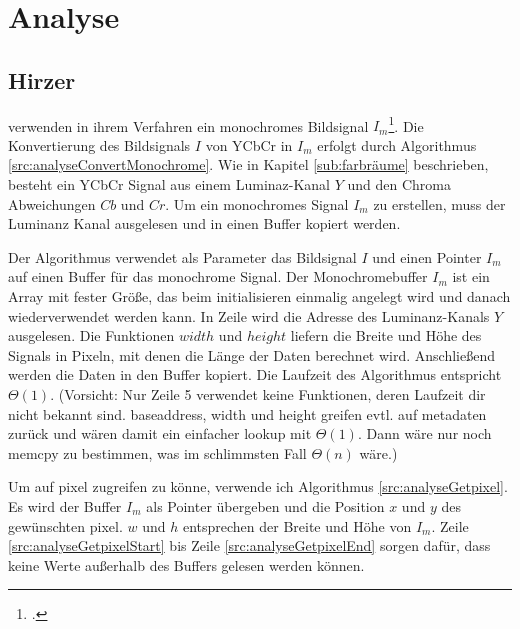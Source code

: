 \section{Analyse} %
\label{sec:analyse}
\begin{comment}
	Detailierte Beschreibung der Algorithmen inkl. O-Notation (Nitty-Gritty Darstellung der Algos)
	1. ARToolKit
	2. ARToolKitPlus
	3. Zissermann/Clarke
	Analyse: Die auswertung nach den Kriterein aus Kap. Vorgehen OHNE WERTUNG! Nur die Daten erheben und auswerten.
\end{comment}

\subsection{Hirzer} %
\label{sub:hirzer}

\citeauthor{clarke96} verwenden in ihrem Verfahren ein monochromes Bildsignal $I_m$\footcite[Vgl.][S.~417]{clarke96}. Die Konvertierung des Bildsignals $I$ von YCbCr in $I_m$ erfolgt durch Algorithmus \ref{src:analyseConvertMonochrome}. Wie in Kapitel \ref{sub:farbräume} beschrieben, besteht ein YCbCr Signal aus einem Luminaz-Kanal $Y$ und den Chroma Abweichungen $Cb$ und $Cr$. Um ein monochromes Signal $I_m$ zu erstellen, muss der Luminanz Kanal ausgelesen und in einen Buffer kopiert werden.



Der Algorithmus verwendet als Parameter das Bildsignal $I$ und einen Pointer $I_m$ auf einen Buffer für das monochrome Signal. Der Monochromebuffer $I_m$ ist ein Array mit fester Größe, das beim initialisieren einmalig angelegt wird und danach wiederverwendet werden kann. In Zeile  wird die Adresse des Luminanz-Kanals $Y$ ausgelesen. Die Funktionen $width$ und $height$ liefern die Breite und Höhe des Signals in Pixeln, mit denen die Länge der Daten berechnet wird. Anschließend werden die Daten in den Buffer kopiert. Die Laufzeit des Algorithmus entspricht $\Theta(1)$. (Vorsicht: Nur Zeile 5 verwendet keine Funktionen, deren Laufzeit dir nicht bekannt sind. baseaddress, width und height greifen evtl. auf metadaten zurück und wären damit ein einfacher lookup mit $\Theta(1)$. Dann wäre nur noch memcpy zu bestimmen, was im schlimmsten Fall $\Theta(n)$ wäre.)

Um auf \gls{pixel} zugreifen zu könne, verwende ich Algorithmus \ref{src:analyseGetpixel}. Es wird der Buffer $I_m$ als Pointer übergeben und die Position $x$ und $y$ des gewünschten \gls{pixel}. $w$ und $h$ entsprechen der Breite und Höhe von $I_m$. Zeile \ref{src:analyseGetpixelStart} bis Zeile \ref{src:analyseGetpixelEnd} sorgen dafür, dass keine Werte außerhalb des Buffers gelesen werden können.


